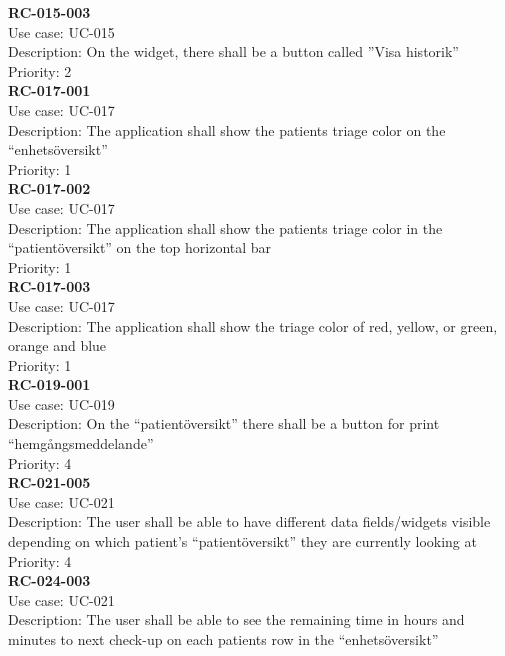 \newline
\textbf{RC-015-003} \\
Use case: UC-015 \\
Description: On the widget, there shall be a button called ”Visa historik” \\
Priority: 2 \\
\newline
\textbf{RC-017-001} \\
Use case: UC-017 \\
Description: The application shall show the patients triage color on the “enhetsöversikt” \\
Priority: 1 \\
\newline
\textbf{RC-017-002} \\
Use case: UC-017 \\
Description: The application shall show the patients triage color in the “patientöversikt” on the top horizontal bar  \\
Priority: 1 \\
\newline
\textbf{RC-017-003} \\
Use case: UC-017 \\
Description: The application shall show the triage color of red, yellow, or green, orange and blue \\
Priority: 1 \\
\newline
\textbf{RC-019-001} \\
Use case: UC-019 \\
Description: On the “patientöversikt” there shall be a button for print “hemgångsmeddelande”  \\
Priority: 4 \\
\newline
\textbf{RC-021-005} \\
Use case: UC-021 \\
Description: The user shall be able to have different data fields/widgets visible depending on which patient’s “patientöversikt” they are currently looking at  \\
Priority: 4 \\
\newline
\textbf{RC-024-003} \\
Use case: UC-021 \\
Description: The user shall be able to see the remaining time in hours and minutes to next check-up on each patients row in the “enhetsöversikt”  \\
